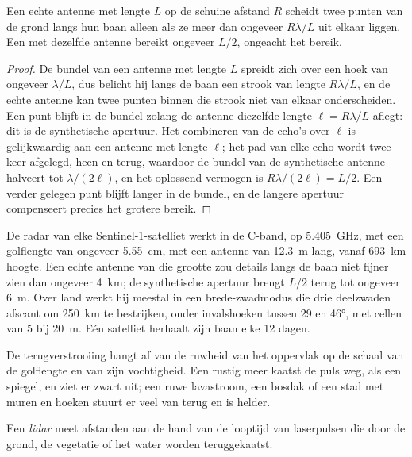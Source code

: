 \begin{proposition}[Azimutresolutie]\label{prop:b3:remote-sensing-gis:azimuth}
Een echte antenne met lengte $L$ op de schuine afstand $R$ scheidt twee punten van
de grond langs hun baan alleen als ze meer dan ongeveer $R\lambda/L$
uit elkaar liggen. Een  met dezelfde antenne bereikt ongeveer $L/2$,
ongeacht het bereik.
\end{proposition}

\begin{proof}
De bundel van een antenne met lengte $L$ spreidt zich over een hoek van ongeveer
$\lambda/L$, dus belicht hij langs de baan een strook van lengte $R\lambda/L$, en
de echte antenne kan twee punten binnen die strook niet van elkaar onderscheiden. Een punt blijft in
de bundel zolang de antenne diezelfde lengte $\ell = R\lambda/L$ aflegt:
dit is de synthetische apertuur. Het combineren van de echo's over $\ell$ is
gelijkwaardig aan een antenne met lengte $\ell$; het pad van elke echo wordt
twee keer afgelegd, heen en terug, waardoor de bundel van de synthetische
antenne halveert tot $\lambda/(2\ell)$, en het oplossend vermogen is $R\lambda/(2\ell) =
L/2$. Een verder gelegen punt blijft langer in de bundel, en de langere apertuur
compenseert precies het grotere bereik.
\end{proof}

De radar van elke Sentinel-1-satelliet werkt in de C-band, op
\qty{5.405}{GHz}, met een golflengte van ongeveer \qty{5.55}{cm}, met een antenne
van \qty{12.3}{m} lang, vanaf \qty{693}{km} hoogte. Een echte antenne van die grootte zou
details langs de baan niet fijner zien dan ongeveer \qty{4}{km}; de synthetische
apertuur brengt $L/2$ terug tot ongeveer \qty{6}{m}. Over land werkt hij meestal in een
brede-zwadmodus die drie deelzwaden afscant om \qty{250}{km} te bestrijken, onder
invalshoeken tussen 29 en \ang{46}, met cellen van 5 bij \qty{20}{m}.
Eén satelliet herhaalt zijn baan elke 12 dagen.

De terugverstrooiing hangt af van de ruwheid van het oppervlak op de schaal van de
golflengte en van zijn vochtigheid. Een rustig meer kaatst de puls weg, als een
spiegel, en ziet er zwart uit; een ruwe lavastroom, een bosdak of een stad met muren
en hoeken stuurt er veel van terug en is helder.

\begin{definition}[Lidar]\label{def:b3:remote-sensing-gis:lidar}
Een \emph{lidar} meet afstanden aan de hand van de looptijd van laserpulsen
die door de grond, de vegetatie of het water worden teruggekaatst.
\end{definition}

